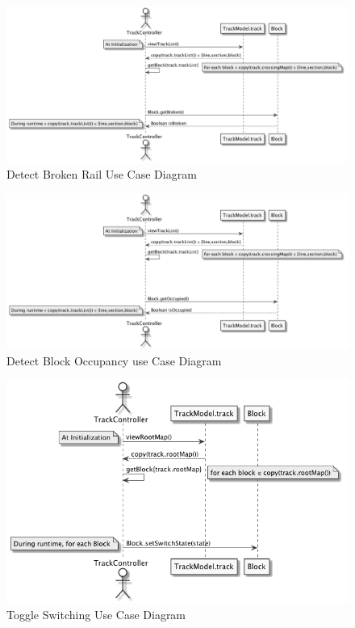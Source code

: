 \documentclass[]{article}
\begin{document}
\begin{figure}[H]
	\centering
	\includegraphics[scale=.3]{detectBroken.png}
	\caption{Detect Broken Rail Use Case Diagram}
\end{figure}

\begin{figure}[H]
	\centering
	\includegraphics[scale=.3]{detectOccupied.png}
	\caption{Detect Block Occupancy use Case Diagram}
\end{figure}

\begin{figure}[H]
	\centering
	\includegraphics[scale=.3]{switching.png}
	\caption{Toggle Switching Use Case Diagram}
\end{figure}
\end{document}
